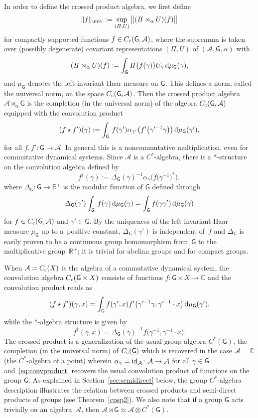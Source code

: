 \documentclass[10pt,a4paper]{amsart}
\numberwithin{equation}{section}
\def\dd{{\rm d}}
\newcommand{\sfG}{\mathsf{G}}
\newcommand{\Pim}{{\mathit\Pi}}
\newcommand{\complex}{{\mathbb C}} %
\newcommand{\real}{{\mathbb R}} %
\def\alg{{\mathcal A}}
\begin{document}
In order to define the crossed product
algebra, we first define
\[
\|f\|_{\rm univ} := \sup_{({\mathit\Pi},U)} \big\|({\mathit\Pi}\rtimes_\alpha U)(f)\big\|
\]
for compactly supported functions $f\in C_{\rm c}(\sfG,\alg) $, where the supremum is taken
over (possibly degenerate) covariant representations
$({\mathit\Pi},U)$ of $(\alg, \sfG, \alpha)$ with
\[
(\Pim\rtimes_\alpha U)(f) := \int_\sfG
\Pim\big(f(\gamma)\big) U_\gamma\, \dd\mu_\sfG(\gamma) ,
\]
and $\mu_\sfG$ denotes the left invariant Haar measure on $\sfG$. This defines a norm, called the universal norm, on the
space $C_{\rm c}(\sfG,\alg)$.
Then the crossed product algebra $\alg\rtimes_\alpha \sfG$ is the
completion (in the universal norm) of the algebra $C_{\rm c}(\sfG,\alg)$
equipped with the convolution product
\begin{gather}\label{eq:convproduct}
(f\star f')(\gamma) := \int_\sfG\, f(\gamma') \alpha_{\gamma'}\big(f'\big(\gamma'^{-1} \gamma\big)\big)\, \dd \mu_\sfG(\gamma')
,
\end{gather}
for all $f,f'\colon \sfG\to\alg$. In general this is a noncommutative
multiplication, even for commutative dynamical systems.
Since $\alg$ is a $C^*$-algebra, there is a $*$-structure on the
convolution algebra defined by
\[
f^\dag(\gamma):= \Delta_\sfG(\gamma)^{-1} \alpha_\gamma\big(f\big(\gamma^{-1}\big)^*\big) ,
\]
where $\Delta_\sfG\colon \sfG\to \real^+$ is the modular function of
$\sfG$ defined through
\[
\Delta_\sfG(\gamma')
\int_\sfG\,f(\gamma)\,\dd\mu_\sfG(\gamma)=\int_\sfG f(\gamma \gamma')\,\dd\mu_\sfG(\gamma)
\]
for $f\in C_{\rm c}(\sfG,\alg)$ and $\gamma'\in \sfG$. By the uniqueness of the left
invariant Haar measure $\mu_\sfG$ up to a~positive
constant, $\Delta_\sfG(\gamma')$ is independent of~$f$
and $\Delta_\sfG$ is easily proven to be a continuous group homomorphism from~$\sfG$ to the
multiplicative group~$\real^+$; it is trivial for abelian groups and for compact
groups.

When $\alg=C_{\rm c}(X)$
is the algebra of a commutative dynamical system, the convolution
algebra $C_{\rm c}(\sfG\times X)$ consists of functions $f\colon\sfG\times X\to\complex$ and the
convolution product reads as
\[
(f\star f')(\gamma,x) = \int_\sfG f(\gamma',x)
f'\big(\gamma'^{-1} \gamma,\gamma'^{-1}\cdot x\big)\, \dd \mu_\sfG(\gamma') ,
\]
while the $*$-algebra structure is given by
\[
f^\dag(\gamma,x) = \Delta_\sfG(\gamma)^{-1} \overline{f\big(\gamma^{-1},\gamma^{-1}\cdot x\big)} .
\]
The crossed product is a generalization of the usual group algebra
$C^*(\sfG)$, the completion (in the universal norm) of $C_{\rm
 c}(\sfG)$ which is recovered in the case $\alg=\complex$
(the $C^*$-algebra of a point)
wherein $\alpha_\gamma={\rm id}_\alg\colon \alg\to \alg$ for all $\gamma\in \sfG$ and~\eqref{eq:convproduct} recovers the usual convolution product of
functions on the group $\sfG$. As explained in
Section~\ref{sec:semidirect} below, the
group $C^*$-algebra description illustrates the relation between crossed
products and semi-direct products of groups (see Theorem~\ref{cpsp2}). We also
note that if a group $\sfG$ acts trivially on an algebra~$\alg$, then
$\alg\rtimes\sfG\simeq\alg\otimes C^*(\sfG)$.
\end{document}
